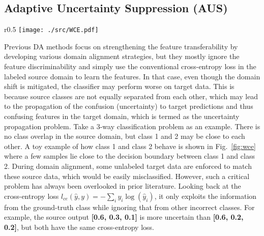\documentclass[runningheads]{llncs}
\begin{document}
\subsection{Adaptive Uncertainty Suppression (AUS)}
	\label{sec:aus}
	\begin{wrapfigure}{r}{0.5\textwidth}
		\centering
		\texttt{[image: ./src/WCE.pdf]}
		\caption{Mitigating the effects of uncertainty propagation from source. [\textcolor{blue}{blue}: source, \textcolor{red}{red}: target, \textcolor{hui}{gray}: adversarial alignment.]}
		\label{fig:wce}
	\end{wrapfigure}
Previous DA methods focus on strengthening the feature transferability by developing various domain alignment strategies, but they mostly ignore the feature discriminability and simply use the conventional cross-entropy loss in the labeled source domain to learn the features.
In that case, even though the domain shift is mitigated, the classifier may perform worse on target data.
This is because source classes are not equally separated from each other, which may lead to the propagation of the confusion (uncertainty) to target predictions and thus confusing features in the target domain, which is termed as the uncertainty propagation problem.
Take a 3-way classification problem as an example. 
There is no class overlap in the source domain, but class 1 and 2 may be close to each other.
A toy example of how class 1 and class 2 behave is shown in Fig.~\ref{fig:wce} where a few samples lie close to the decision boundary between class 1 and class 2.
During domain alignment, some unlabeled target data are enforced to match these source data, which would be easily misclassified. 
However, such a critical problem has always been overlooked in prior literature. 
Looking back at the cross-entropy loss $l_{ce}(\hat{y},y) = -\sum_i y_i \log(\hat{y}_i)$, it only exploits the information from the ground-truth class while ignoring that from other incorrect classes.
For example, the source output \textbf{[0.6, 0.3, 0.1]} is more uncertain than \textbf{[0.6, 0.2, 0.2]}, but both have the same cross-entropy loss.
\end{document}
